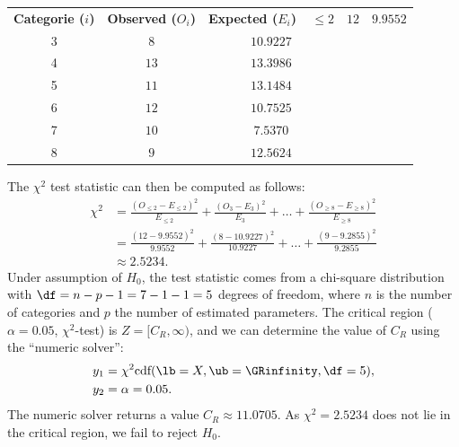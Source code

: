 {\begin{enumerate}[label=(\alph*)]
        \begin{tabular}{ccc}
            \toprule
                \textbf{Categorie ($i$)} & \textbf{Observed ($O_i$)} & \textbf{Expected ($E_i$)} \
            \midrule
                $\leq 2$ & $12$ & $9.9552$ \\
                3 & $8$  & $10.9227$ \\
                4 & $13$ & $13.3986$ \\
                5 & $11$ & $13.1484$ \\
                6 & $12$ & $10.7525$ \\
                7 & $10$ & $7.5370$ \\
                8 & $9$  & $12.5624$ \\
            \bottomrule
        \end{tabular}


        The $\chi^2$ test statistic can then be computed as follows:
        \begin{align*}
            \chi^2 &= \frac{(O_{\leq 2} - E_{\leq 2})^2}{E_{\leq 2}} + \frac{(O_{3} - E_{3})^2}{E_{3}} + \ldots + \frac{(O_{\geq 8} - E_{\geq 8})^2}{E_{\geq 8}}\\
                &= \frac{(12 - 9.9552)^2}{9.9552} + \frac{(8 - 10.9227)^2}{10.9227} + \ldots + \frac{(9 - 9.2855)^2}{9.2855}\\
                &\approx 2.5234.
        \end{align*}
        Under assumption of $H_0$, the test statistic comes from a chi-square distribution with $\df = n - p - 1 = 7 - 1 - 1 = 5$ degrees of freedom,
        where $n$ is the number of categories and $p$ the number of estimated parameters.
        The critical region ($\alpha = 0.05$, $\chi^2$-test) is $Z = [C_R, \infty)$, and we can determine the value of $C_R$
        using the \enquote{numeric solver}:
        \begin{align*}
            y_1 &= \chi^2\text{cdf}(\lb=X, \ub=\GRinfinity, \df=5), \\
            y_2 &= \alpha = 0.05.
        \end{align*}
        The numeric solver returns a value $C_R \approx 11.0705$.
        As $\chi^2 = 2.5234$ does not lie in the critical region, we fail to reject $H_0$.
        

\end{enumerate}}
